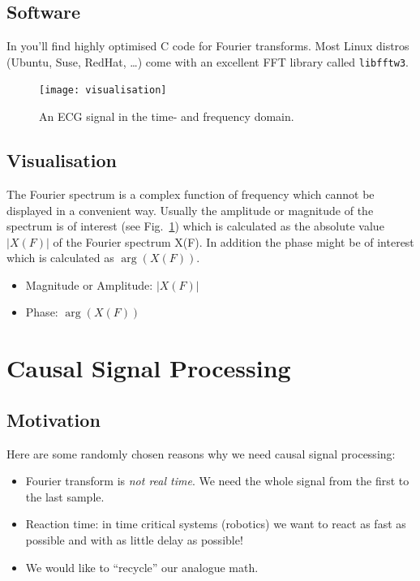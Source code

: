 \documentclass[12pt,a4paper]{article}
\begin{document}
\subsection{Software}
In \citet{NumericalRec2007} you'll find highly optimised C code
for Fourier transforms. Most Linux distros (Ubuntu, Suse, RedHat, \ldots)
come with an excellent FFT library called \texttt{libfftw3}.


\begin{figure}[!hbt]
\begin{center}
\mbox{\texttt{[image: visualisation]}}
\end{center}
\caption{
An ECG signal in the time- and frequency domain.
\label{visualisation}}
\end{figure}


\subsection{Visualisation}
The Fourier spectrum is a complex function of frequency which cannot
be displayed in a convenient way. Usually the amplitude or magnitude
of the spectrum is of interest (see Fig.~\ref{visualisation}) which is calculated as the
absolute value $|X(F)|$ of the Fourier spectrum X(F). In addition
the phase might be of interest which is calculated as $\arg(X(F))$.
\begin{itemize}
\item Magnitude or Amplitude: $|X(F)|$
\item Phase: $\arg(X(F))$
\end{itemize}

\clearpage





\section{Causal Signal Processing}

\subsection{Motivation}

Here are some randomly chosen reasons why we need causal
signal processing:
\begin{itemize}
\item Fourier transform is \textsl{not real time}.  
We need the whole signal from the first to the last sample.
\item Reaction time: in time critical systems (robotics) we
want to react as fast as possible and with as little delay as possible!
\item We would like to ``recycle'' our analogue math.
\end{itemize}
\end{document}
